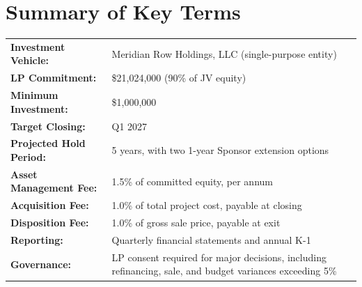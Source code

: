 \section{Summary of Key Terms}

\begin{tcolorbox}[colback=jvcream, colframe=jvnavy, arc=1mm, boxrule=1pt,
  title={\sffamily\small\bfseries Indicative Term Sheet -- Subject to Definitive Documentation},
  coltitle=white, colbacktitle=jvnavy, left=10pt, right=10pt, top=8pt, bottom=8pt]
\sffamily\small
\begin{tabularx}{\linewidth}{@{}l X@{}}
\textbf{Investment Vehicle:} & Meridian Row Holdings, LLC (single-purpose entity) \\[2pt]
\textbf{LP Commitment:} & \$21,024,000 (90\% of JV equity) \\[2pt]
\textbf{Minimum Investment:} & \$1,000,000 \\[2pt]
\textbf{Target Closing:} & Q1 2027 \\[2pt]
\textbf{Projected Hold Period:} & 5 years, with two 1-year Sponsor extension options \\[2pt]
\textbf{Asset Management Fee:} & 1.5\% of committed equity, per annum \\[2pt]
\textbf{Acquisition Fee:} & 1.0\% of total project cost, payable at closing \\[2pt]
\textbf{Disposition Fee:} & 1.0\% of gross sale price, payable at exit \\[2pt]
\textbf{Reporting:} & Quarterly financial statements and annual K-1 \\[2pt]
\textbf{Governance:} & LP consent required for major decisions, including refinancing, sale, and budget variances exceeding 5\%
\end{tabularx}
\end{tcolorbox}

\vspace{4pt}


